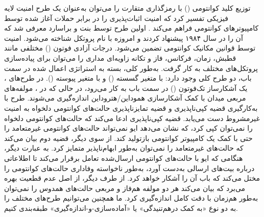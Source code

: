 توزیع کلید کوانتومی () با رمزگذاری متقارت را می‌توان به‌عنوان یک طرح امنیت لایه فیزیکی تفسیر کرد که امنیت اثبات‌پذیری را در برابر حملات آغاز شده توسط کامپیوترهای کوانتومی فراهم می‌کند \cite{21}. اولین طرح  توسط بنت و براسارد معرفی شد که آن را در سال ۱۹۸۴ پیشنهاد کردند \cite{15,16} و امروزه با نام پروتکل  شناخته می‌شود. امنیت  توسط قوانین مکانیک کوانتومی تضمین می‌شود. درجات آزادی فوتون () مختلفی مانند قطبش، زمان، فرکانس، فاز و تکانه زاویه‌ای مداری را می‌توان برای پیاده‌سازی پروتکل‌های مختلف  به کار گرفت. به‌طور کلی، بسته به استراتژی اعمال شده در سمت باب، دو طرح کلی  وجود دارد:  با متغیر گسسته () و  با متغیر پیوسته (). در طرح‌های ، یک آشکارساز تک‌فوتون () در سمت باب به کار می‌رود، در حالی که در ، مولفه‌های مربعی میدان با کمک آشکارسازی هموداین/هتروداین اندازه‌گیری می‌شوند. طرح  با به‌کارگیری قضیه کپی‌ناپذیری و قضیه تمایزناپذیری حالت‌های کوانتومی دلخواه به امنیت غیرمشروط دست می‌یابد. قضیه کپی‌ناپذیری ادعا می‌کند که حالت‌های کوانتومی دلخواه را نمی‌توان کپی کرد، که نشان می‌دهد ایو نمی‌تواند حالت‌های کوانتومی غیرمتعامد را حتی با کمک یک کامپیوتر کوانتومی بازتولید کند. از سوی دیگر، قضیه دوم بیان می‌کند که حالت‌های غیرمتعامد را نمی‌توان به‌طور ابهام‌ناپذیر متمایز کرد. به عبارت دیگر، هنگامی که ایو با حالت‌های کوانتومی ارسال‌شده تعامل برقرار می‌کند تا اطلاعاتی درباره بیت‌های ارسالی به‌دست آورد، به‌طور ناخواسته وفاداری حالت‌های کوانتومی را مختل می‌کند که باب آن را آشکار خواهد کرد. از طرف دیگر،  از اصل عدم قطعیت بهره می‌برد که بیان می‌کند هر دو مولفه هم‌فاز و مربعی حالت‌های همدوس را نمی‌توان به‌طور هم‌زمان با دقت کامل اندازه‌گیری کرد. ما همچنین می‌توانیم طرح‌های مختلف  را به دو نوع «به کمک درهم‌تنیدگی» یا «آماده‌سازی-و-اندازه‌گیری» طبقه‌بندی کنیم.

